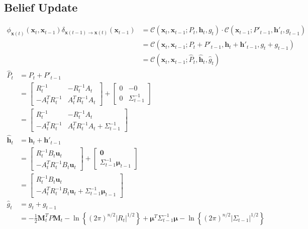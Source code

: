  
\subsection{Belief Update}
\label{section:belief_update}

\begin{align}
\phi_{\pmb{x}(t)}(\pmb{x}_{t}, \pmb{x}_{t-1}) \delta_{\pmb{x}(t-1) \rightarrow \pmb{x}(t)} (\pmb{x}_{t-1}) &= 
\mathcal{C} \left( \pmb{x}_t, \pmb{x}_{t-1} ; P_t, \pmb{h}_{t}, g_{t} \right) \cdot \mathcal{C} \left( \pmb{x}_{t-1}; P'_{t-1}, \pmb{h}'_{t}, g_{t-1} \right) \nonumber \\
&= \mathcal{C} \left( \pmb{x}_t, \pmb{x}_{t-1}; P_{t} + P'_{t-1}, \pmb{h}_{t} + \pmb{h}'_{t-1}, g_{t} + g_{t-1} \right) \nonumber \\
&= \mathcal{C} \left( \pmb{x}_t, \pmb{x}_{t-1}; \hat{P}_{t}, \hat{\pmb{h}}_{t}, \hat{g}_{t} \right) 
\end{align}
\begin{align}
\hat{P}_{t} &= P_{t} + P'_{t-1} \nonumber  \\ 
&=  \begin{bmatrix} R_{t}^{-1} & -R_{t}^{-1} A_{t} \\ -A_{t}^{T} R_{t}^{-1} & A_{t}^{T} R_{t}^{-1} A_{t} \end{bmatrix} +  \begin{bmatrix} 0 & -0 \\ 0 &  \Sigma^{-1}_{t-1} \end{bmatrix} \nonumber \\
&= \begin{bmatrix} R_{t}^{-1} & -R_{t}^{-1} A_{t} \\ -A_{t}^{T} R_{t}^{-1} & A_{t}^{T} R_{t}^{-1} A_{t} +  \Sigma^{-1}_{t-1} \end{bmatrix} \\
\hat{\pmb{h}}_{t} &= \pmb{h}_t + \pmb{h}'_{t-1} \nonumber \\
&= \begin{bmatrix} R_{t}^{-1} B_{t} \pmb{u}_{t} \\ - A_{t}^{T} R_{t}^{-1} B_{t} \pmb{u}_{t}  \end{bmatrix} + \begin{bmatrix} \pmb{0} \\ \Sigma_{t-1}^{-1} \pmb{\mu}_{t-1} \end{bmatrix} \nonumber \\
&= \begin{bmatrix} R_{t}^{-1} B_{t} \pmb{u}_{t} \\ - A_{t}^{T} R_{t}^{-1} B_{t} \pmb{u}_{t} + \Sigma_{t-1}^{-1} \pmb{\mu}_{t-1} \end{bmatrix} \\
\hat{g}_{t} &= g_{t} + g_{t-1} \nonumber \\
&=  -\frac{1}{2}\pmb{M}_{t}^{T} P \pmb{M}_{t} - \ln{ \left\{  (2 \pi)^{n/2} |R_{t} |^{1/2} \right\} } + \pmb{\mu}^{T} \Sigma_{t-1}^{-1} \pmb{\mu} -\ln{ \left\{ (2 \pi)^{n/2} | \Sigma_{t-1} |^{1/2} \right\} }
\end{align}

